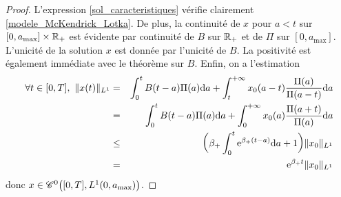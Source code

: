\begin{proof}
    L'expression \eqref{sol_caracteristiques} vérifie clairement \eqref{modele_McKendrick_Lotka}. De plus, la continuité de $x$ pour $a<t$ sur $[0,a_{\max}] \times \mathbb{R}_+$ est évidente par continuité de $B$ sur $\mathbb{R}_+$ et de $\Pi$ sur $[0,a_{\max}]$. L'unicité de la solution $x$ est donnée par l'unicité de $B$. La positivité est également immédiate avec le théorème sur $B$. Enfin, on a l'estimation 
    \begin{eqnarray*}
        \forall t \in [0,T], \ \|x(t)\|_{L^1} &=& \int_0^t B(t-a)\Pi(a)\mathrm{d} a + \int_t^{+\infty} x_0(a-t)\frac{\Pi(a)}{\Pi(a-t)}\mathrm{d} a \\
        &=&\int_0^t B(t-a)\Pi(a)\mathrm{d} a + \int_0^{+\infty} x_0(a)\frac{\Pi(a+t)}{\Pi(a)}\mathrm{d} a \\
        &\leq& \bigg(\beta_+\int_0^t \mathrm{e}^{\beta_+(t-a)}\mathrm{d} a+1\bigg)\|x_0\|_{L^1} \\
        &=& \mathrm{e}^{\beta_+t}\|x_0\|_{L^1}
    \end{eqnarray*}
    donc $x \in \mathscr{C}^0\big([0,T], L^1(0,a_{\max})\big)$.
\end{proof}

